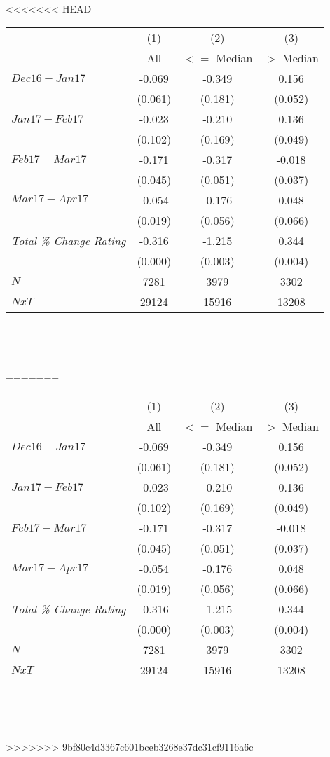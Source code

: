 <<<<<<< HEAD
\begin{center}
\begin{tabular}{lccc}
\hline  & (1) & (2) & (3)\\
 & All &  $<=$ Median  &  $>$ Median\\
\hline  $ Dec16-Jan17 $  & -0.069 & -0.349 & 0.156\\
 & (0.061) & (0.181) & (0.052)\\
 $ Jan17-Feb17 $  & -0.023 & -0.210 & 0.136\\
 & (0.102) & (0.169) & (0.049)\\
 $ Feb17-Mar17 $  & -0.171 & -0.317 & -0.018\\
 & (0.045) & (0.051) & (0.037)\\
 $ Mar17-Apr17 $  & -0.054 & -0.176 & 0.048\\
 & (0.019) & (0.056) & (0.066)\\
\hline \textit{Total \% Change Rating} & -0.316 & -1.215 & 0.344\\
  & (0.000) & (0.003) & (0.004)\\
\hline  $ N $  & 7281 & 3979 & 3302\\
 $ NxT $  & 29124 & 15916 & 13208\\
\hline\end{tabular}\\
\begin{tiny} \hfil\end{tiny}\\
\end{center}
=======
\begin{center}
\begin{tabular}{lccc}
\hline  & (1) & (2) & (3)\\
 & All &  $<=$ Median  &  $>$ Median\\
\hline  $ Dec16-Jan17 $  & -0.069 & -0.349 & 0.156\\
 & (0.061) & (0.181) & (0.052)\\
 $ Jan17-Feb17 $  & -0.023 & -0.210 & 0.136\\
 & (0.102) & (0.169) & (0.049)\\
 $ Feb17-Mar17 $  & -0.171 & -0.317 & -0.018\\
 & (0.045) & (0.051) & (0.037)\\
 $ Mar17-Apr17 $  & -0.054 & -0.176 & 0.048\\
 & (0.019) & (0.056) & (0.066)\\
\hline \textit{Total \% Change Rating} & -0.316 & -1.215 & 0.344\\
  & (0.000) & (0.003) & (0.004)\\
\hline  $ N $  & 7281 & 3979 & 3302\\
 $ NxT $  & 29124 & 15916 & 13208\\
\hline\end{tabular}\\
\begin{tiny} \hfil\end{tiny}\\
\end{center}
>>>>>>> 9bf80c4d3367c601bceb3268e37dc31cf9116a6c
